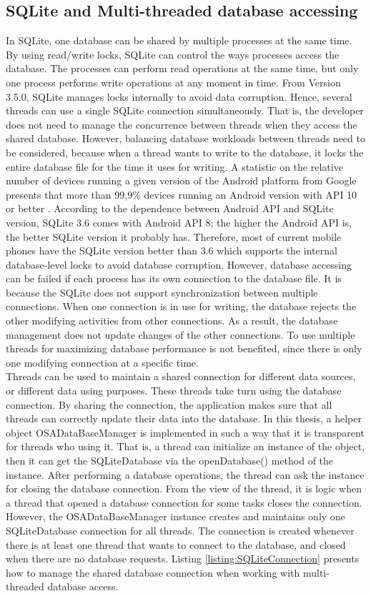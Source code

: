 \subsection{SQLite and Multi-threaded database accessing}
In SQLite, one database can be shared by multiple processes at the same time. By using read/write locks, SQLite can control the ways processes access the database. The processes can perform read operations at the same time, but only one process performs write operations at any moment in time. From Version 3.5.0, SQLite manages locks internally to avoid data corruption. Hence, several threads can use a single SQLite connection simultaneously. That is, the developer does not need to manage the concurrence between threads when they access the shared database. However, balancing database workloads between threads need to be considered, because when a thread wants to write to the database, it locks the entire database file for the time it uses for writing.
A statistic on the relative number of devices running a given version of the Android platform from Google presents that more than 99,9\% devices running an Android version with API 10 or better \citep{DEVELOPERANDROIDAPI}. According to the dependence between Android API and SQLite version\citep{DEVELOPERANDROIDSQL}, SQLite 3.6 comes with Android API 8; the higher the Android API is, the better SQLite version it probably has. Therefore, most of current mobile phones have the SQLite version better than 3.6 which supports the internal database-level locks to avoid database corruption. However, database accessing can be failed if each process has its own connection to the database file. It is because the SQLite does not support synchronization between multiple connections. When one connection is in use for writing, the database rejects the other modifying activities from other connections. As a result, the database management does not update changes of the other connections. To use multiple threads for maximizing database performance is not benefited, since there is only one modifying connection at a specific time.\\
Threads can be used to maintain a shared connection for different data sources, or different data using purposes. These threads take turn using the database connection. By sharing the connection, the application makes sure that all threads can correctly update their data into the database. In this thesis, a helper object OSADataBaseManager is implemented in such a way that it is transparent for threads who using it. That is, a thread can initialize an instance of the object, then it can get the SQLiteDatabase via the openDatabase() method of the instance. After performing a database operations, the thread can ask the instance for closing the database connection. From the view of the thread, it is logic when a thread that opened a database connection for some tasks closes the connection. However, the OSADataBaseManager instance creates and maintains only one SQLiteDatabase connection for all threads. The connection is created whenever there is at least one thread that wants to connect to the database, and closed when there are no database requests. Listing \ref{listing:SQLiteConnection} presents how to manage the shared database connection when working with multi-threaded database access.\\
